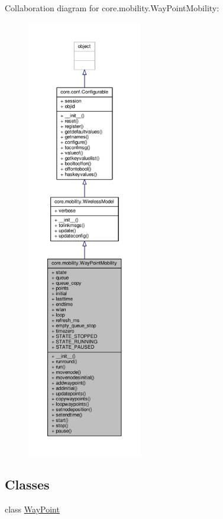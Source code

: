 Collaboration diagram for core.\+mobility.\+Way\+Point\+Mobility\+:
\nopagebreak
\begin{figure}[H]
\begin{center}
\leavevmode
\includegraphics[height=550pt]{classcore_1_1mobility_1_1_way_point_mobility__coll__graph}
\end{center}
\end{figure}
\subsection*{Classes}
\begin{DoxyCompactItemize}
\item 
class \hyperlink{classcore_1_1mobility_1_1_way_point_mobility_1_1_way_point}{Way\+Point}
\end{DoxyCompactItemize}
